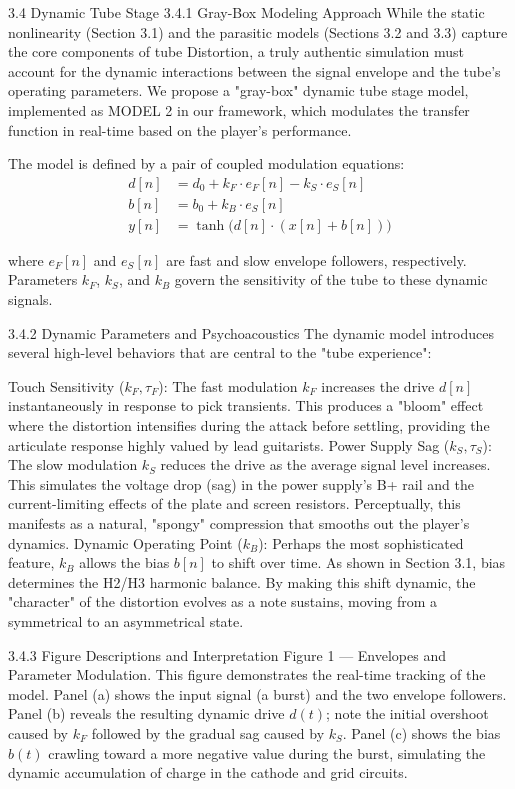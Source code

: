 3.4 Dynamic Tube Stage
3.4.1 Gray-Box Modeling Approach
While the static nonlinearity (Section 3.1) and the parasitic models (Sections 3.2 and 3.3) capture the core components of tube Distortion, a truly authentic simulation must account for the dynamic interactions between the signal envelope and the tube's operating parameters. We propose a "gray-box" dynamic tube stage model, implemented as MODEL 2 in our framework, which modulates the transfer function in real-time based on the player's performance.

The model is defined by a pair of coupled modulation equations:
\begin{align}
d[n] &= d_0 + k_F \cdot e_F[n] - k_S \cdot e_S[n] \tag{12} \\
b[n] &= b_0 + k_B \cdot e_S[n] \tag{13} \\
y[n] &= \tanh\bigl(d[n] \cdot (x[n] + b[n])\bigr) \tag{14}
\end{align}

where $e_F[n]$ and $e_S[n]$ are fast and slow envelope followers, respectively. Parameters $k_F$, $k_S$, and $k_B$ govern the sensitivity of the tube to these dynamic signals.

3.4.2 Dynamic Parameters and Psychoacoustics
The dynamic model introduces several high-level behaviors that are central to the "tube experience":

Touch Sensitivity ($k_F, \tau_F$): The fast modulation $k_F$ increases the drive $d[n]$ instantaneously in response to pick transients. This produces a "bloom" effect where the distortion intensifies during the attack before settling, providing the articulate response highly valued by lead guitarists.
Power Supply Sag ($k_S, \tau_S$): The slow modulation $k_S$ reduces the drive as the average signal level increases. This simulates the voltage drop (sag) in the power supply's B+ rail and the current-limiting effects of the plate and screen resistors. Perceptually, this manifests as a natural, "spongy" compression that smooths out the player's dynamics.
Dynamic Operating Point ($k_B$): Perhaps the most sophisticated feature, $k_B$ allows the bias $b[n]$ to shift over time. As shown in Section 3.1, bias determines the H2/H3 harmonic balance. By making this shift dynamic, the "character" of the distortion evolves as a note sustains, moving from a symmetrical to an asymmetrical state.

3.4.3 Figure Descriptions and Interpretation
Figure 1 — Envelopes and Parameter Modulation. This figure demonstrates the real-time tracking of the model. Panel (a) shows the input signal (a burst) and the two envelope followers. Panel (b) reveals the resulting dynamic drive $d(t)$; note the initial overshoot caused by $k_F$ followed by the gradual sag caused by $k_S$. Panel (c) shows the bias $b(t)$ crawling toward a more negative value during the burst, simulating the dynamic accumulation of charge in the cathode and grid circuits.

